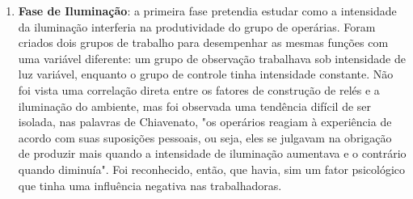 \begin{enumerate}
	\item \textbf{Fase de Iluminação}: a primeira fase pretendia estudar como a intensidade da iluminação interferia na produtividade do grupo de operárias. Foram criados dois grupos de trabalho para desempenhar as mesmas funções com uma variável diferente: um grupo de observação trabalhava sob intensidade de luz variável, enquanto o grupo de controle tinha intensidade constante. Não foi vista uma correlação direta entre os fatores de construção de relés e a iluminação do ambiente, mas foi observada uma tendência difícil de ser isolada, nas palavras de Chiavenato, "os operários reagiam à experiência de acordo com suas suposições pessoais, ou seja, eles se julgavam na obrigação de produzir mais quando a intensidade de iluminação aumentava e o contrário quando diminuía". Foi reconhecido, então, que havia, sim um fator psicológico que tinha uma influência negativa nas trabalhadoras.
	

\end{enumerate}

